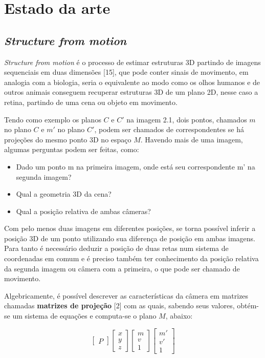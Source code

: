 \chapter{Estado da arte}

\section{\textit{Structure from motion}}

\textit{Structure from motion} é o processo de estimar estruturas 3D partindo de imagens sequenciais em duas dimensões [15], que pode conter sinais de movimento, em analogia com a biologia, seria o equivalente ao modo  como os olhos humanos e de outros animais conseguem recuperar estruturas 3D de um plano 2D, nesse caso a retina, partindo de uma cena ou objeto em movimento.

Tendo como exemplo os planos $C$ e $C'$ na imagem 2.1, dois pontos, chamados $m$ no plano $C$ e $m'$ no plano $C'$, podem ser chamados de correspondentes se há projeções do mesmo ponto 3D no espaço $M$. Havendo mais de uma imagem, algumas perguntas podem ser feitas, como:

\begin{itemize}
	\item{Dado um ponto m na primeira imagem, onde está seu correspondente m’ na segunda imagem?}
	\item{Qual a geometria 3D da cena?}
	\item{Qual a posição relativa de ambas câmeras?}
\end{itemize}
	
Com pelo menos duas imagens em diferentes posições, se torna possível inferir a posição 3D de um ponto utilizando sua diferença de posição em ambas imagens. Para tanto é necessário deduzir a posição de duas retas num sistema de coordenadas em comum e é preciso também ter conhecimento da posição relativa da segunda imagem ou câmera com a primeira, o que pode ser chamado de movimento.

Algebricamente, é possível descrever as características da câmera em matrizes chamadas \textbf{matrizes de projeção} [2] com as quais, sabendo seus valores, obtém-se um sistema de equações e computa-se o plano $M$, abaixo:

$$
	\begin{bmatrix}
		P
	\end{bmatrix}
	\begin{bmatrix}
		x\\y\\z
	\end{bmatrix}
	\begin{bmatrix}
		m\\v\\1
	\end{bmatrix}
	\begin{bmatrix}
		m'\\v'\\1
	\end{bmatrix}
$$

